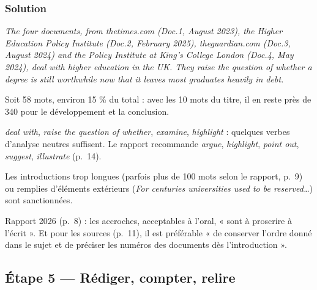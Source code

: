 \documentclass[11pt,a4paper]{article}
\begin{document}
\hypertarget{solution-3}{%
\subsubsection{Solution}\label{solution-3}}

\emph{The four documents, from thetimes.com (Doc.1, August 2023), the Higher Education Policy Institute (Doc.2, February 2025), theguardian.com (Doc.3, August 2024) and the Policy Institute at King's College London (Doc.4, May 2024), deal with higher education in the UK. They raise the question of whether a degree is still worthwhile now that it leaves most graduates heavily in debt.}

Soit 58 mots, environ 15 \% du total : avec les 10 mots du titre, il en reste près de 340 pour le développement et la conclusion.

\begin{methode}

\emph{deal with}, \emph{raise the question of whether}, \emph{examine}, \emph{highlight} : quelques verbes d'analyse neutres suffisent. Le rapport recommande \emph{argue}, \emph{highlight}, \emph{point out}, \emph{suggest}, \emph{illustrate} (p.~14).

\end{methode}

\begin{piege}

Les introductions trop longues (parfois plus de 100 mots selon le rapport, p.~9) ou remplies d'éléments extérieurs (\emph{For centuries universities used to be reserved\ldots{}}) sont sanctionnées.

\end{piege}

\begin{jury}

Rapport 2026 (p.~8) : les accroches, acceptables à l'oral, « sont à proscrire à l'écrit ». Et pour les sources (p.~11), il est préférable « de conserver l'ordre donné dans le sujet et de préciser les numéros des documents dès l'introduction ».

\end{jury}

\hypertarget{uxe9tape-5-ruxe9diger-compter-relire}{%
\subsection{Étape 5 --- Rédiger, compter, relire}\label{uxe9tape-5-ruxe9diger-compter-relire}}
\end{document}
